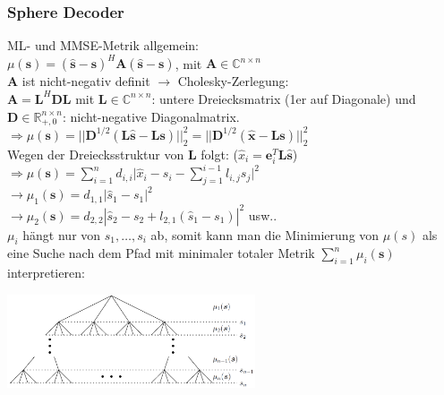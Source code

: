 \documentclass[a4paper,landscape,6pt]{article}
\newcommand{\ma}[1]{\ensuremath{\boldsymbol {#1}}}								%
\renewcommand{\vec}[1]{\ensuremath{\boldsymbol {#1}}}							%
\begin{document}
\begin{multicols}{3}
\subsubsection*{Sphere Decoder}
ML- und MMSE-Metrik allgemein:\\
$\mu(\vec s) = (\hat{\vec s} - \vec s)^H \ma A (\hat{\vec s} - \vec s)$, mit $\ma A \in \mathbb{C}^{n\times n}$\\
$\ma A$ ist nicht-negativ definit $\rightarrow$ Cholesky-Zerlegung: \\$\ma A = \ma L^H \ma D \ma L$ mit $\ma L \in \mathbb{C}^{n\times n}$: untere Dreiecksmatrix (1er auf Diagonale) und $\ma D \in \mathbb{R}_{+,0}^{n\times n}$: nicht-negative Diagonalmatrix.\\
$\Rightarrow \mu(\vec s) = ||\ma D^{1/2}(\ma L \hat{\vec s} - \ma L \vec s)||_2^2 =  ||\ma D^{1/2}(\hat{\vec x} - \ma L \vec s)||_2^2$\\
Wegen der Dreiecksstruktur von $\ma L$ folgt: ($\hat x_i = \vec e_i^T \ma L \hat{\vec s}$)\\
$\Rightarrow \mu(\vec s) = \sum\limits_{i=1}^n d_{i,i} \big | \hat x_i - s_i - \sum\limits_{j=1}^{i-1} l_{i,j}s_j \big | ^2$\\
$\rightarrow \mu_1(\vec s) = d_{1,1} |\hat s_1 - s_1|^2$\\
$\rightarrow \mu_2(\vec s) = d_{2,2} |\hat s_2 - s_2 + l_{2,1}(\hat s_1 - s_1)|^2$ usw..\\
$\mu_i$ hängt nur von $s_1, \dots, s_i$ ab, somit kann man die Minimierung von $\mu(s)$ als eine Suche nach dem Pfad mit minimaler totaler Metrik $\sum_{i=1}^{n} \mu_i(\vec s)$ interpretieren:\\
\begin{minipage}[h]{0.6\textwidth}
	\includegraphics[width=0.55\textwidth]{images_ssp/Baum}\\
\end{minipage}

\end{multicols}
\end{document}
